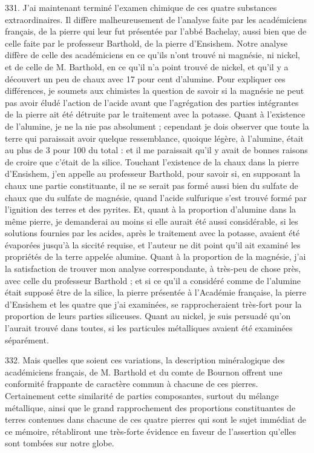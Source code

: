 \documentclass[a4paper, 11pt, oneside, polutonikogreek, french]{article}
\begin{document}
331. J'ai maintenant terminé l'examen chimique de ces quatre substances extraordinaires. Il diffère malheureusement de l'analyse faite par les académiciens français, de la pierre qui leur fut présentée par l'abbé Bachelay, aussi bien que de celle faite par le professeur Barthold, de la pierre d'Ensishem. Notre analyse diffère de celle des académiciens en ce qu'ils n'ont trouvé ni magnésie, ni nickel, et de celle de M. Barthold, en ce qu'il n'a point trouvé de nickel, et qu'il y a découvert un peu de chaux avec 17 pour cent d'alumine. Pour expliquer ces différences, je soumets aux chimistes la question de savoir si la magnésie ne peut pas avoir éludé l'action de l'acide avant que l'agrégation des parties intégrantes de la pierre ait été détruite par le traitement avec la potasse. Quant à l'existence de l'alumine, je ne la nie pas absolument ; cependant je dois observer que toute la terre qui paraissait avoir quelque ressemblance, quoique légère, à l'alumine, était au plus de 3 pour 100 du total : et il me paraissait qu'il y avait de bonnes raisons de croire que c'était de la silice. Touchant l'existence de la chaux dans la pierre d'Ensishem, j'en appelle au professeur Barthold, pour savoir si, en supposant la chaux une partie constituante, il ne se serait pas formé aussi bien du sulfate de chaux que du sulfate de magnésie, quand l'acide sulfurique s'est trouvé formé par l'ignition des terres et des pyrites. Et, quant à la proportion d'alumine dans la même pierre, je demanderai au moins si elle aurait été aussi considérable, si les solutions fournies par les acides, après le traitement avec la potasse, avaient été évaporées jusqu'à la siccité requise, et l'auteur ne dit point qu'il ait examiné les propriétés de la terre appelée alumine. Quant à la proportion de la magnésie, j'ai la satisfaction de trouver mon analyse correspondante, à très-peu de chose près, avec celle du professeur Barthold ; et si ce qu'il a considéré comme de l'alumine était supposé être de la silice, la pierre présentée à l'Académie française, la pierre d'Ensishem et les quatre que j'ai examinées, se rapprocheraient très-fort pour la proportion de leurs parties siliceuses. Quant au nickel, je suis persuadé qu'on l'aurait trouvé dans toutes, si les particules métalliques avaient été examinées séparément.

332. Mais quelles que soient ces variations, la description minéralogique des académiciens français, de M. Barthold et du comte de Bournon offrent une conformité frappante de caractère commun à chacune de ces pierres. Certainement cette similarité de parties composantes, surtout du mélange métallique, ainsi que le grand rapprochement des proportions constituantes de terres contenues dans chacune de ces quatre pierres qui sont le sujet immédiat de ce mémoire, rétabliront une très-forte évidence en faveur de l'assertion qu'elles sont tombées sur notre globe.
\end{document}
